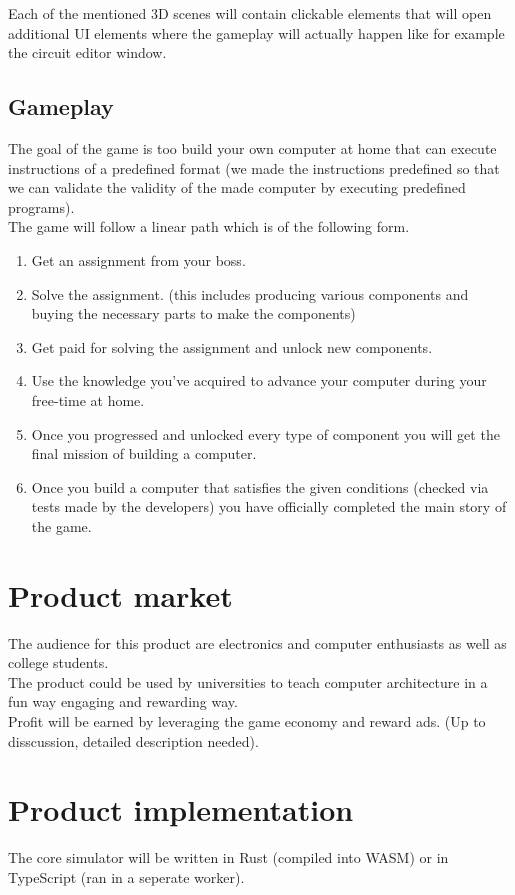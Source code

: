 \documentclass[12pt]{article}
\begin{document}
Each of the mentioned 3D scenes will contain clickable elements that will open additional UI elements where the gameplay will actually happen 
like for example the circuit editor window.

\subsection{Gameplay}
The goal of the game is too build your own computer at home that can execute instructions of a predefined format (we made the instructions 
predefined so that we can validate the validity of the made computer by executing predefined programs).\\
The game will follow a linear path which is of the following form.\\
\begin{enumerate}
    \item Get an assignment from your boss.
    \item Solve the assignment. (this includes producing various components and buying the necessary parts to make the components)
    \item Get paid for solving the assignment and unlock new components.
    \item Use the knowledge you've acquired to advance your computer during your free-time at home.
    \item Once you progressed and unlocked every type of component you will get the final mission of building a computer.
    \item Once you build a computer that satisfies the given conditions (checked via tests made by the developers) you have officially completed the main story of the game.
\end{enumerate}

\section{Product market}
The audience for this product are electronics and computer enthusiasts as well as college students.\\
The product could be used by universities to teach computer architecture in a fun way engaging and rewarding way.\\
Profit will be earned by leveraging the game economy and reward ads. (Up to disscussion, detailed description needed).\\
\section{Product implementation}
The core simulator will be written in Rust (compiled into WASM) or in TypeScript (ran in a seperate worker).
\end{document}
